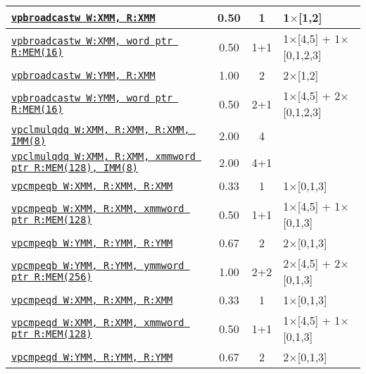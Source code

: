 \documentclass[a4paper,english,fontsize=9]{scrartcl}
\begin{document}
\begin{longtable}{p{}ccL{.25\textwidth}}
  \midrule
  \texttt{\href{https://felixcloutier.com/x86/VPBROADCASTB:VPBROADCASTW:VPBROADCASTD:VPBROADCASTQ.html}{vpbroadcastw W:XMM, R:XMM}} & 0.50 & 1 & 1\(\times\)[1,2] \\
  \midrule
  \texttt{\href{https://felixcloutier.com/x86/VPBROADCASTB:VPBROADCASTW:VPBROADCASTD:VPBROADCASTQ.html}{vpbroadcastw W:XMM, word ptr R:MEM(16)}} & 0.50 & 1+1 & 1\(\times\)[4,5] + 1\(\times\)[0,1,2,3] \\
  \midrule
  \texttt{\href{https://felixcloutier.com/x86/VPBROADCASTB:VPBROADCASTW:VPBROADCASTD:VPBROADCASTQ.html}{vpbroadcastw W:YMM, R:XMM}} & 1.00 & 2 & 2\(\times\)[1,2] \\
  \midrule
  \texttt{\href{https://felixcloutier.com/x86/VPBROADCASTB:VPBROADCASTW:VPBROADCASTD:VPBROADCASTQ.html}{vpbroadcastw W:YMM, word ptr R:MEM(16)}} & 0.50 & 2+1 & 1\(\times\)[4,5] + 2\(\times\)[0,1,2,3] \\
  \midrule
  \texttt{\href{https://felixcloutier.com/x86/PCLMULQDQ.html}{vpclmulqdq W:XMM, R:XMM, R:XMM, IMM(8)}} & 2.00 & 4 &  \\
  \midrule
  \texttt{\href{https://felixcloutier.com/x86/PCLMULQDQ.html}{vpclmulqdq W:XMM, R:XMM, xmmword ptr R:MEM(128), IMM(8)}} & 2.00 & 4+1 &  \\
  \midrule
  \texttt{\href{https://felixcloutier.com/x86/PCMPEQB:PCMPEQW:PCMPEQD.html}{vpcmpeqb W:XMM, R:XMM, R:XMM}} & 0.33 & 1 & 1\(\times\)[0,1,3] \\
  \midrule
  \texttt{\href{https://felixcloutier.com/x86/PCMPEQB:PCMPEQW:PCMPEQD.html}{vpcmpeqb W:XMM, R:XMM, xmmword ptr R:MEM(128)}} & 0.50 & 1+1 & 1\(\times\)[4,5] + 1\(\times\)[0,1,3] \\
  \midrule
  \texttt{\href{https://felixcloutier.com/x86/PCMPEQB:PCMPEQW:PCMPEQD.html}{vpcmpeqb W:YMM, R:YMM, R:YMM}} & 0.67 & 2 & 2\(\times\)[0,1,3] \\
  \midrule
  \texttt{\href{https://felixcloutier.com/x86/PCMPEQB:PCMPEQW:PCMPEQD.html}{vpcmpeqb W:YMM, R:YMM, ymmword ptr R:MEM(256)}} & 1.00 & 2+2 & 2\(\times\)[4,5] + 2\(\times\)[0,1,3] \\
  \midrule
  \texttt{\href{https://felixcloutier.com/x86/PCMPEQB:PCMPEQW:PCMPEQD.html}{vpcmpeqd W:XMM, R:XMM, R:XMM}} & 0.33 & 1 & 1\(\times\)[0,1,3] \\
  \midrule
  \texttt{\href{https://felixcloutier.com/x86/PCMPEQB:PCMPEQW:PCMPEQD.html}{vpcmpeqd W:XMM, R:XMM, xmmword ptr R:MEM(128)}} & 0.50 & 1+1 & 1\(\times\)[4,5] + 1\(\times\)[0,1,3] \\
  \midrule
  \texttt{\href{https://felixcloutier.com/x86/PCMPEQB:PCMPEQW:PCMPEQD.html}{vpcmpeqd W:YMM, R:YMM, R:YMM}} & 0.67 & 2 & 2\(\times\)[0,1,3] \\

\end{longtable}
\end{document}
